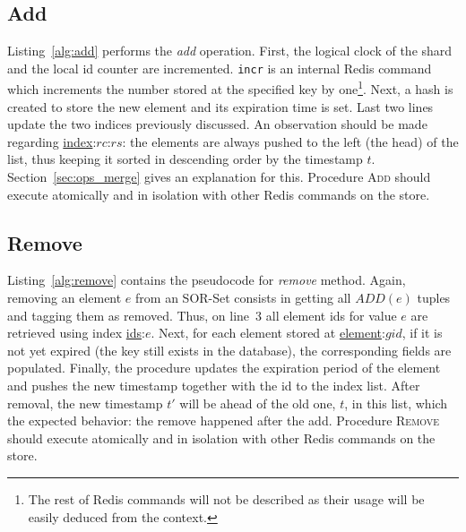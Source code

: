 \subsection{Add}
\label{sec:ops_add}

Listing~\ref{alg:add} performs the \textit{add} operation.
First, the logical clock of the shard and the local id counter are incremented.
\texttt{incr} is an internal Redis command which increments the number stored at
the specified key by one\footnote{The rest of Redis commands will not be
described as their usage will be easily deduced from the context.}. Next, a
hash is created to store the new element and its expiration time is set. Last
two lines update the two indices previously discussed. An observation should be
made regarding \underline{index}:$rc$:$rs$: the elements are always pushed to
the left (the head) of the list, thus keeping it sorted in descending order by
the timestamp $t$. Section~\ref{sec:ops_merge} gives an explanation for this.
Procedure {\small\textsc{Add}} should execute atomically and in isolation with
other Redis commands on the store.

\subsection{Remove}
\label{sec:ops_remove}

Listing~\ref{alg:remove} contains the pseudocode for \textit{remove} method.
Again, removing an element $e$ from an SOR-Set consists in getting all $ADD(e)$
tuples and tagging them as removed. Thus, on line~3 all element ids for value
$e$ are retrieved using index \underline{ids}:$e$. Next, for each element stored
at \underline{element}:$gid$, if it is not yet expired (the key still exists in
the database), the corresponding fields are populated. Finally, the procedure
updates the expiration period of the element and pushes the new timestamp
together with the id to the index list. After removal, the new timestamp $t'$
will be ahead of the old one, $t$, in this list, which the expected behavior:
the remove happened after the add. Procedure {\small\textsc{Remove}} should
execute atomically and in isolation with other Redis commands on the store.

